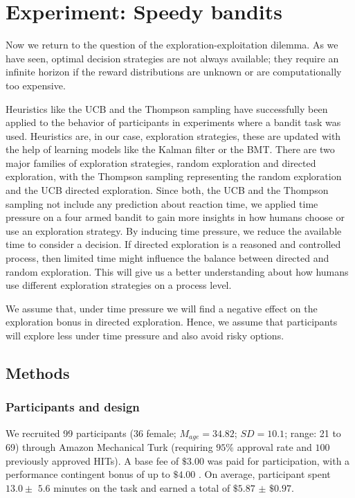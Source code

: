 
\chapter{Experiment: Speedy bandits} \label{ch:experiment}
Now we return to the question of the exploration-exploitation dilemma. As we have seen, optimal decision strategies are not always available; they require an infinite horizon if the reward distributions are unknown or are computationally too expensive. 

Heuristics like the UCB and the Thompson sampling have successfully been applied to the behavior of participants in experiments where a bandit task was used. Heuristics are, in our case, exploration strategies, these are updated with the help of learning models like the Kalman filter or the BMT. There are two major families of exploration strategies, random exploration and directed exploration, with the Thompson sampling representing the random exploration and the UCB directed exploration. 
Since both, the UCB and the Thompson sampling not include any prediction about reaction time, we applied time pressure on a four armed bandit to gain more insights in how humans choose or use an exploration strategy. 
By inducing time pressure, we reduce the available time to consider a decision. If directed exploration is a reasoned and controlled process, then limited time might influence the balance between directed and random exploration. This will give us a better understanding about how humans use different exploration strategies on a process level. 

We assume that, under time pressure we will find a negative effect on the exploration bonus in directed exploration. Hence, we assume that participants will explore less under time pressure and also avoid risky options. 

\section{Methods}
\subsection{Participants and design}
We recruited 99 participants (36 female; $M_{age}=34.82$; $SD=10.1$; range: 21 to 69) through Amazon Mechanical Turk (requiring $95\%$ approval rate and $100$ previously approved HITs). A base fee of $\$3.00$ was paid for participation, with a performance contingent bonus of up to $\$4.00$ . On average, participant spent $13.0 \pm$ $5.6$ minutes on the task and earned a total of $\$5.87$ $\pm$ $\$0.97$.  

